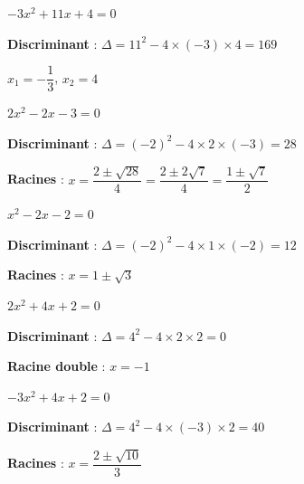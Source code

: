 \documentclass[11pt,a4paper]{article}  %
\begin{document}
\begin{enumMet}
	\item $-3 x^2+11 x+4=0$
	\begin{corrBox}
		\begin{itemMet}
			\item \textbf{Discriminant} : \( \Delta = 11^2 - 4 \times (-3) \times 4 = 169 \)
			\item \( x_1 = -\dfrac{1}{3} \), \( x_2 = 4 \)
		\end{itemMet}
	\end{corrBox}
	\item $2 x^2-2 x-3=0$
	\begin{corrBox}
		\begin{itemMet}
			\item \textbf{Discriminant} : \( \Delta = (-2)^2 - 4 \times 2 \times (-3) = 28 \)
			\item \textbf{Racines} : \( x = \dfrac{2 \pm \sqrt{28}}{4} = \dfrac{2 \pm 2\sqrt{7}}{4} = \dfrac{1 \pm \sqrt{7}}{2} \)
		\end{itemMet}		
	\end{corrBox}
	\item $x^2-2 x-2=0$
	\begin{corrBox}
		\begin{itemMet}
			\item \textbf{Discriminant} : \( \Delta = (-2)^2 - 4 \times 1 \times (-2) = 12 \)
			\item \textbf{Racines} : \( x = 1 \pm \sqrt{3} \)
		\end{itemMet}		
	\end{corrBox}
	\item $2 x^2+4 x+2=0$
	\begin{corrBox}
		\begin{itemMet}
			\item \textbf{Discriminant} : \( \Delta = 4^2 - 4 \times 2 \times 2 = 0 \)
			\item \textbf{Racine double} : \( x = -1 \)
		\end{itemMet}
	\end{corrBox}
	\item $-3 x^2+4 x+2=0$
	\begin{corrBox}
		\begin{itemMet}
			\item \textbf{Discriminant} : \( \Delta = 4^2 - 4 \times (-3) \times 2 = 40 \)
			\item \textbf{Racines} : \( x = \dfrac{2 \pm \sqrt{10}}{3} \)
		\end{itemMet}		
	\end{corrBox}

\end{enumMet}
\end{document}
